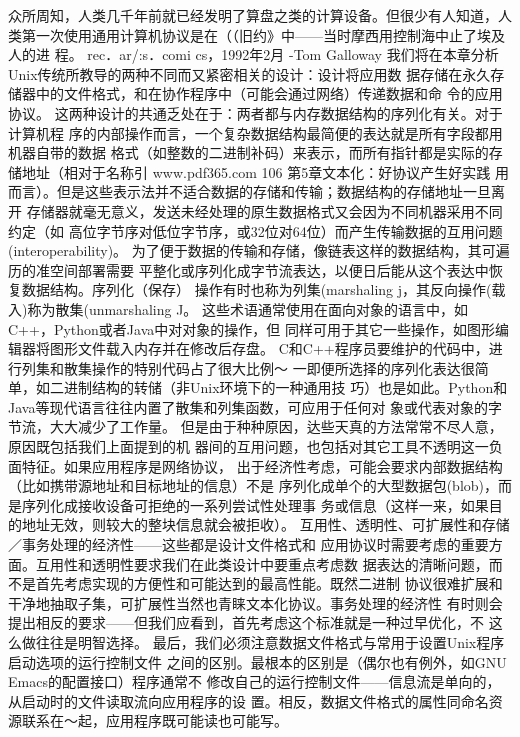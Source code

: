 \documentclass[11pt,oneside]{book}
\begin{document}
\begin{common-format}
    众所周知，人类几千年前就已经发明了算盘之类的计算设备。但很少有人知道，人
类第一次使用通用计算机协议是在（（旧约》中——当时摩西用控制海中止了埃及人的进
程。
    rec．ar/:s．comi cs，1992年2月
    -Tom Galloway
    我们将在本章分析Unix传统所教导的两种不同而又紧密相关的设计：设计将应用数
据存储在永久存储器中的文件格式，和在协作程序中（可能会通过网络）传递数据和命
令的应用协议。
    这两种设计的共通乏处在于：两者都与内存数据结构的序列化有关。对于计算机程
序的内部操作而言，一个复杂数据结构最简便的表达就是所有字段都用机器自带的数据
格式（如整数的二进制补码）来表示，而所有指针都是实际的存储地址（相对于名称引
www.pdf365.com
106
第5章文本化：好协议产生好实践
用而言）。但是这些表示法并不适合数据的存储和传输；数据结构的存储地址一旦离开
存储器就毫无意义，发送未经处理的原生数据格式又会因为不同机器采用不同约定（如
高位字节序对低位字节序，或32位对64位）而产生传输数据的互用问题(interoperability)。
    为了便于数据的传输和存储，像链表这样的数据结构，其可遍历的准空间部署需要
平整化或序列化成字节流表达，以便日后能从这个表达中恢复数据结构。序列化（保存）
操作有时也称为列集(marshaling j，其反向操作(载入)称为散集(unmarshaling J。
这些术语通常使用在面向对象的语言中，如C++，Python或者Java中对对象的操作，但
同样可用于其它一些操作，如图形编辑器将图形文件载入内存并在修改后存盘。
    C和C++程序员要维护的代码中，进行列集和散集操作的特别代码占了很大比例～
一即便所选择的序列化表达很简单，如二进制结构的转储（非Unix环境下的一种通用技
巧）也是如此。Python和Java等现代语言往往内置了散集和列集函数，可应用于任何对
象或代表对象的字节流，大大减少了工作量。
    但是由于种种原因，达些天真的方法常常不尽人意，原因既包括我们上面提到的机
器间的互用问题，也包括对其它工具不透明这一负面特征。如果应用程序是网络协议，
出于经济性考虑，可能会要求内部数据结构（比如携带源地址和目标地址的信息）不是
序列化成单个的大型数据包(blob)，而是序列化成接收设备可拒绝的一系列尝试性处理事
务或信息（这样一来，如果目的地址无效，则较大的整块信息就会被拒收）。
    互用性、透明性、可扩展性和存储／事务处理的经济性——这些都是设计文件格式和
应用协议时需要考虑的重要方面。互用性和透明性要求我们在此类设计中要重点考虑数
据表达的清晰问题，而不是首先考虑实现的方便性和可能达到的最高性能。既然二进制
协议很难扩展和干净地抽取子集，可扩展性当然也青睐文本化协议。事务处理的经济性
有时则会提出相反的要求——但我们应看到，首先考虑这个标准就是一种过早优化，不
这么做往往是明智选择。
    最后，我们必须注意数据文件格式与常用于设置Unix程序启动选项的运行控制文件
之间的区别。最根本的区别是（偶尔也有例外，如GNU Emacs的配置接口）程序通常不
修改自己的运行控制文件——信息流是单向的，从启动时的文件读取流向应用程序的设
置。相反，数据文件格式的属性同命名资源联系在～起，应用程序既可能读也可能写。

\end{common-format}
\end{document}
